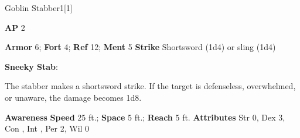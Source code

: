 \begin{monsection}{Goblin Stabber}{1}[1]
\vspace{-1em}\vspace{-1em}
\begin{spellcontent}
\begin{spelltargetinginfo}
{\textbf{AP} 2}

\pari \textbf{Armor} 6;
\textbf{Fort} 4;
\textbf{Ref} 12;
\textbf{Ment} 5
\pari \textbf{Strike} Shortsword  (1d4) or sling  (1d4)



\end{spelltargetinginfo}


\begin{spelleffects}

\pari
\textbf{Sneeky Stab}:

The stabber makes a shortsword strike.
If the target is defenseless, overwhelmed, or unaware, the damage becomes 1d8.




\end{spelleffects}

\end{spellcontent}

\begin{monsterfooter}
\pari \textbf{Awareness} 
\pari \textbf{Speed} 25 ft.;
\textbf{Space} 5 ft.;
\textbf{Reach} 5 ft.
\pari \textbf{Attributes}
Str 0,
Dex 3,
Con ,
Int ,
Per 2,
Wil 0
\end{monsterfooter}
\end{monsection}



